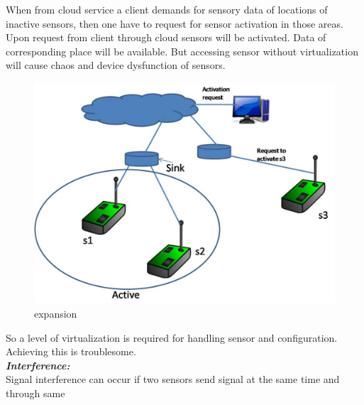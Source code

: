 \documentclass {report}
\begin{document}
 When from cloud service a client demands for sensory data of locations of inactive sensors, then one have to request for sensor activation in those areas. Upon request from client through cloud sensors will be activated. Data of corresponding place will be available. But accessing sensor without virtualization will cause chaos and device dysfunction of sensors. 

\begin{figure}
\begin{center}
\includegraphics [scale=0.5]{expansion}
\caption{expansion}
\end{center}
\end{figure}
\newpage
So a level of virtualization is required for handling sensor and configuration. Achieving this is troublesome.\\


{\bfseries \emph{Interference:}\\}  Signal interference can occur if two sensors send signal at the same time and through same
\end{document}
